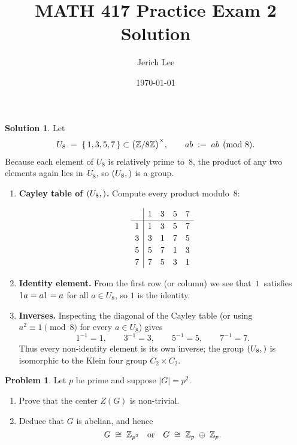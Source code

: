 \documentclass[12pt]{article}
\title{MATH 417 Practice Exam 2 Solution}
\author{Jerich Lee}
\date{\today}
\theoremstyle{definition} %
\newtheorem{solution}{Solution}
\newtheorem{problem}{Problem}
\theoremstyle{plain} %
\begin{document}
\maketitle
\begin{solution}
  Let 
  \[
     U_{8}\;=\;\{\,1,3,5,7\,\}
     \subset\bigl(\Bbb Z/8\Bbb Z\bigr)^{\times},
     \qquad 
     a\*b\;:=\;ab\pmod{8}.
  \]
  Because each element of $U_{8}$ is relatively prime to~$8$, the product
  of any two elements again lies in~$U_{8}$, so $(U_{8},\*)$ is a group.
  
  \bigskip
  \begin{enumerate}[]
  \item \textbf{Cayley table of $(U_{8},\*)$.}\;
        Compute every product modulo~$8$:
  
        \[
        \renewcommand{\arraystretch}{1.2}
        \begin{array}{c|cccc}
            \* & 1 & 3 & 5 & 7\\\hline
            1  & 1 & 3 & 5 & 7\\
            3  & 3 & 1 & 7 & 5\\
            5  & 5 & 7 & 1 & 3\\
            7  & 7 & 5 & 3 & 1
        \end{array}
        \]
  
  \item \textbf{Identity element.}\;
        From the first row (or column) we see that 
        $\boxed{\,1\,}$ satisfies $1\*a=a\*1=a$ for all $a\in U_{8}$, 
        so $1$ is the identity.
  
  \item \textbf{Inverses.}\;
        Inspecting the diagonal of the Cayley table (or using $a^{2}\equiv1\pmod8$ for every $a\in U_{8}$) gives
        \[
           1^{-1}=1,\qquad
           3^{-1}=3,\qquad
           5^{-1}=5,\qquad
           7^{-1}=7.
        \]
        Thus every non-identity element is its own inverse; the group
        $(U_{8},\*)$ is isomorphic to the Klein four group
        $C_{2}\times C_{2}$.
  \end{enumerate}
  \end{solution}
  \begin{problem}
    Let $p$ be prime and suppose $|G| = p^{2}$.
    \begin{enumerate}[]
       \item Prove that the center $Z(G)$ is non-trivial.
       \item Deduce that $G$ is abelian, and hence
             \[
                G \;\cong\; \Bbb Z_{p^{2}}
                \quad\text{or}\quad
                G \;\cong\; \Bbb Z_{p}\;\oplus\;\Bbb Z_{p}.
             \]
    \end{enumerate}
    \end{problem}
    
\end{document}
